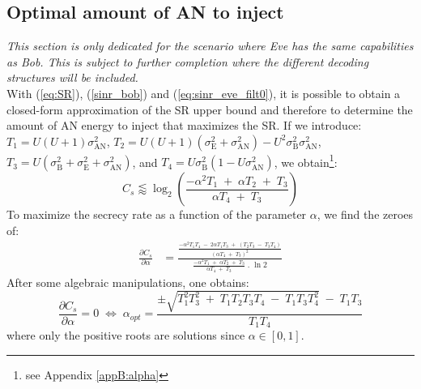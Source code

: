\subsection{Optimal amount of AN to inject}
\label{subsec:best_alpha}
\textit{This section is only dedicated for the scenario where Eve has the same capabilities as Bob. This is subject to further completion where the different decoding structures will be included.}\\

With (\ref{eq:SR}), (\ref{sinr_bob}) and (\ref{eq:sinr_eve_filt0}), it is possible to obtain a closed-form approximation of the SR upper bound and therefore to determine the amount of AN energy to inject that maximizes the SR. If we introduce: $T_1 = U(U+1)\sigma_{\text{AN}}^2$, $T_2 = U(U+1)(\sigma_{\text{E}}^2+\sigma_{\text{AN}}^2) - U^2 \sigma_{\text{B}}^2\sigma_{\text{AN}}^2$, $T_3 = U(\sigma_{\text{B}}^2+\sigma_{\text{E}}^2+\sigma_{\text{AN}}^2)$, and $T_4= U\sigma_{\text{B}}^2(1-U\sigma_{\text{AN}}^2)$, we obtain\footnote{see Appendix \ref{appB:alpha}}:
\begin{equation}
    C_s \lessapprox \log_2 \left( \frac{-\alpha^2 T_1 \; + \; \alpha T_2 \; + \; T_3}{\alpha T_4 \; + \; T_3} \right)
    \label{eq:SR_anal2}
\end{equation}
To  maximize the secrecy rate as a function of the parameter $\alpha$, we find the zeroes of:
\begin{equation}
\begin{split}
    \frac{\partial C_s}{\partial \alpha} &= \frac{ \frac{-\alpha^2 T_1 T_4 \; - \; 2 \alpha T_1 T_3 \; + \; \left( T_2 T_3 \; - \; T_3 T_4 \right) }{\left( \alpha T_4 \; + \; T_3\right)^2} }{ \frac{-\alpha^2 T_1 \; + \; \alpha T_2 \; + \; T_3}{\alpha T_4 \; + \; T_3} \; . \; \ln{2}} 
    \label{eq:SR_derivative}
\end{split}
\end{equation}
After some algebraic manipulations, one obtains: 
\begin{equation}
         \frac{\partial C_s}{\partial \alpha} = 0
         \; \Leftrightarrow \; \alpha_{opt} = \frac{\pm\sqrt{T_1^2 T_3^2 \; + \; T_1 T_2 T_3 T_4 \; - \; T_1 T_3 T_4^2} \; - \; T_1 T_3}{T_1 T_4}
         \label{eq:best_alpha}
\end{equation}
where only the positive roots are solutions since $\alpha \in [0,1]$.




